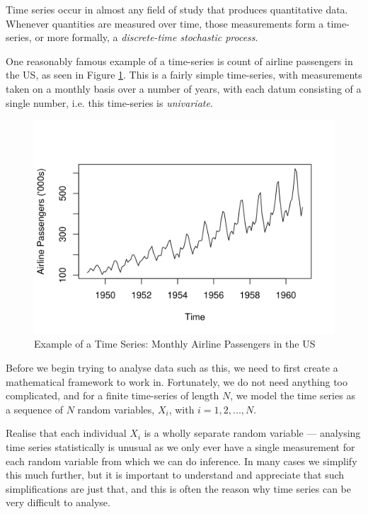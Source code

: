 




\noindent
Time series occur in almost any field of study that produces
quantitative data. Whenever quantities are measured over time, those
measurements form a time-series, or more formally, a
\emph{discrete-time stochastic process}.

One reasonably famous example of a time-series is count of airline
passengers in the US, as seen in Figure \ref{fig1}. This is a fairly
simple time-series, with measurements taken on a monthly basis over a
number of years, with each datum consisting of a single number,
i.e. this time-series is \emph{univariate}.

\begin{figure}[h]
\begin{center}
\includegraphics{airline_passengers_plot.png}
\caption{\label{fig1}
Example of a Time Series: Monthly Airline Passengers in the US}
\end{center}
\end{figure}


Before we begin trying to analyse data such as this, we need to first
create a mathematical framework to work in. Fortunately, we do not
need anything too complicated, and for a finite time-series of length
$N$, we model the time series as a sequence of $N$ random variables,
$X_i$, with $i = 1, 2, ..., N$.

Realise that each individual $X_i$ is a wholly separate random
variable --- analysing time series statistically is unusual as we only
ever have a single measurement for each random variable from which we
can do inference. In many cases we simplify this much further, but it
is important to understand and appreciate that such simplifications
are just that, and this is often the reason why time series can be
very difficult to analyse.

